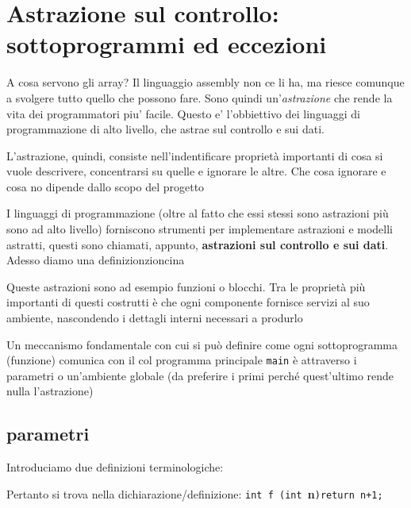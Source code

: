 % 
\chapter{Astrazione sul controllo: sottoprogrammi ed eccezioni}

A cosa servono gli array? Il linguaggio assembly non ce li ha, ma riesce comunque a svolgere tutto quello che possono fare. Sono quindi un'\textit{astrazione} che rende la vita dei programmatori piu' facile. Questo e' l'obbiettivo dei linguaggi di programmazione di alto livello, che astrae sul controllo e sui dati. 

L'astrazione, quindi, consiste nell'indentificare proprietà importanti di cosa si vuole descrivere, concentrarsi su quelle e ignorare le altre. Che cosa ignorare e cosa no dipende dallo scopo del progetto

I linguaggi di programmazione (oltre al fatto che essi stessi sono astrazioni più sono ad alto livello) forniscono strumenti per implementare astrazioni e modelli astratti, questi sono chiamati, appunto, \textbf{astrazioni sul controllo e sui dati}. Adesso diamo una definizionzioncina


Queste astrazioni sono ad esempio funzioni o blocchi. Tra le proprietà più importanti di questi costrutti è che ogni componente fornisce servizi al suo ambiente, nascondendo i dettagli interni necessari a produrlo

Un meccanismo fondamentale con cui si può definire come ogni sottoprogramma (funzione) comunica con il col programma principale \texttt{main} è attraverso i parametri o un'ambiente globale (da preferire i primi perché quest'ultimo rende nulla l'astrazione)

\section{parametri}

Introduciamo due definizioni terminologiche:

Pertanto si trova nella dichiarazione/definizione: \texttt{int f (int }\textbf{n}\texttt{){return n+1;}}

